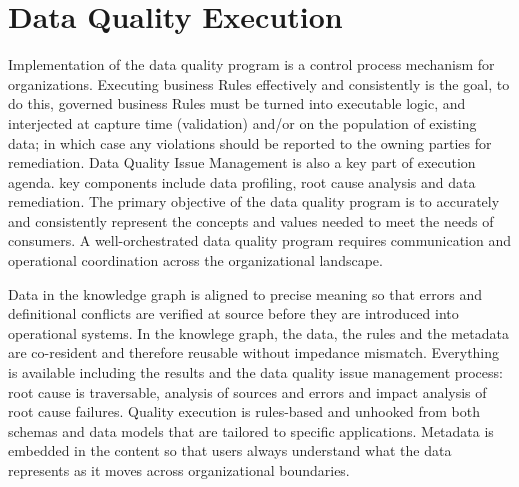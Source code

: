 \section{Data Quality Execution}\label{sec:ekgmm-b-3-3} %

Implementation of the data quality program is a control process mechanism for organizations.
Executing business Rules effectively and consistently is the goal, to do this, governed business Rules must be turned into executable logic, and interjected at capture time (validation) and/or on the population of existing data; in which case any violations should be reported to the owning parties for remediation.
Data Quality Issue Management is also a key part of execution agenda. key components include data profiling, root cause analysis and data remediation.
The primary objective of the data quality program is to accurately and consistently represent the concepts and values needed to meet the needs of consumers.
A well-orchestrated data quality program requires communication and operational coordination across the organizational landscape.

\kgmmekgrationalesection

Data in the knowledge graph is aligned to precise meaning so that errors and definitional conflicts are verified at source before they are introduced into operational systems.
In the knowlege graph, the data, the rules and the metadata are co-resident and therefore reusable without impedance mismatch.
Everything is available including the results and the data quality issue management process: root cause is traversable, analysis of sources and errors and impact analysis of root cause failures.
Quality execution is rules-based and unhooked from both schemas and data models that are tailored to specific applications.
Metadata is embedded in the content so that users always understand what the data represents as it moves across organizational boundaries.

\kgmmcorequestionssection

